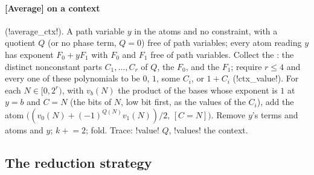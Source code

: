 \paragraph{[Average] on a context} (\code!average_ctx!). A path variable $y$ in the atoms and no constraint, with a quotient $Q$ (or no phase term, $Q=0$) free of path variables; every atom reading $y$ has exponent $F_0+yF_1$ with $F_0$ and $F_1$ free of path variables. Collect the : the distinct nonconstant parts $C_1,\ldots,C_r$ of $Q$, the $F_0$, and the $F_1$; require $r\le4$ and every one of these polynomials to be $0$, $1$, some $C_i$, or $1+C_i$ (\py!ctx_value!). For each $N\in[0,2^r)$, with $v_b(N)$ the product of the bases whose exponent is $1$ at $y=b$ and $C=N$ (the bits of $N$, low bit first, as the values of the $C_i$), add the atom $\bigl((v_0(N)+(-1)^{Q(N)}v_1(N))/2,\,[C=N]\bigr)$. Remove $y$'s terms and atoms and $y$; $k\mathrel{+}=2$; fold. Trace: \code!value! $Q$, \code!values! the context.

\subsection{The reduction strategy}

